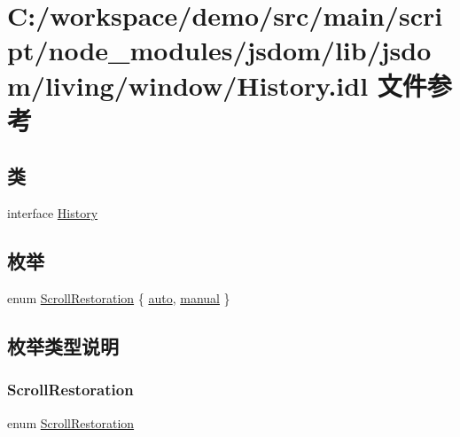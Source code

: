 \hypertarget{_history_8idl}{}\section{C\+:/workspace/demo/src/main/script/node\+\_\+modules/jsdom/lib/jsdom/living/window/\+History.idl 文件参考}
\label{_history_8idl}
\subsection*{类}
\begin{DoxyCompactItemize}
\item 
interface \mbox{\hyperlink{interface_history}{History}}
\end{DoxyCompactItemize}
\subsection*{枚举}
\begin{DoxyCompactItemize}
\item 
enum \mbox{\hyperlink{_history_8idl_a6be21f3fd9dae50744435b4e89cf4ad8}{Scroll\+Restoration}} \{ \mbox{\hyperlink{_history_8idl_a6be21f3fd9dae50744435b4e89cf4ad8a7f6f7d73789a1930881b41898de3446e}{auto}}, 
\mbox{\hyperlink{_history_8idl_a6be21f3fd9dae50744435b4e89cf4ad8af2ff5ec687c78928f81c2842750e3f67}{manual}}
 \}
\end{DoxyCompactItemize}


\subsection{枚举类型说明}
\mbox{\label{_history_8idl_a6be21f3fd9dae50744435b4e89cf4ad8}} 
\subsubsection{\texorpdfstring{Scroll\+Restoration}{ScrollRestoration}}
{\footnotesize\ttfamily enum \mbox{\hyperlink{_history_8idl_a6be21f3fd9dae50744435b4e89cf4ad8}{Scroll\+Restoration}}}

